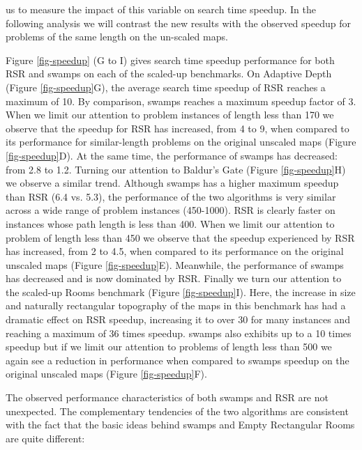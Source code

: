 us to measure the impact of this variable on search time speedup.
In the following analysis we will contrast the new
results with the observed speedup for problems of the same length on the un-scaled maps.
\par
Figure \ref{fig-speedup} (G to I) gives search time speedup performance for both RSR and swamps
on each of the scaled-up benchmarks.
On Adaptive Depth (Figure \ref{fig-speedup}G), the average search time speedup of RSR reaches a maximum of 10. 
By comparison, swamps reaches a maximum speedup factor of 3.
When we limit our attention to problem instances of length less than 170 we observe that the speedup 
for RSR has increased, from 4 to 9, when compared to its performance for similar-length problems on the original 
unscaled maps (Figure \ref{fig-speedup}D). 
At the same time, the performance of swamps has decreased: from 2.8 to 1.2.
Turning our attention to Baldur's Gate (Figure \ref{fig-speedup}H) we observe a similar trend.
Although swamps has a higher maximum speedup than RSR (6.4 vs. 5.3), the performance of the two 
algorithms is very similar across a wide range of problem instances (450-1000).
RSR is clearly faster on instances whose path length is less than 400.
When we limit our attention to problem of length less than 450 we observe that the speedup experienced by
RSR has increased, from 2 to 4.5, when compared to its performance on the original unscaled maps
(Figure \ref{fig-speedup}E).
Meanwhile, the performance of swamps has decreased and is now dominated by RSR.
Finally we turn our attention to the scaled-up Rooms benchmark (Figure \ref{fig-speedup}I).
Here, the increase in size and naturally rectangular topography of the maps in this benchmark
has had a dramatic effect on RSR speedup, increasing it to over 30 for many
instances and reaching a maximum of 36 times speedup.
swamps also exhibits up to a 10 times speedup but if we limit our attention to problems of
length less than 500 we again see a reduction in performance when compared to swamps speedup
on the original unscaled maps (Figure \ref{fig-speedup}F). 
\par
The observed performance characteristics of both swamps and RSR
are not unexpected.
The complementary tendencies of the two algorithms
are consistent with the fact that 
the basic ideas behind swamps and Empty Rectangular Rooms are quite different:
